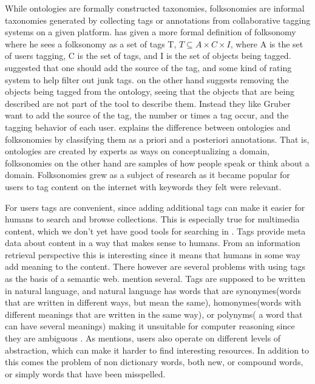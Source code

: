 While ontologies are formally constructed taxonomies, folksonomies are informal taxonomies generated by collecting tags or annotations from collaborative tagging systems on a given platform\citep{Tang2009}.
\citet{Mika2005} has given a more formal definition of folksonomy where he sees a folksonomy as a set of tags T,
$T \subseteq A \times C \times I$, where A is the set of users tagging, C is the set of tags, and I is the set of objects being tagged.
\citet{Gruber2007} suggested that one should add the source of the tag, and some kind of rating system to help filter out junk tags.
\citet{Scerri2008} on the other hand suggests removing the objects being tagged from the ontology,
seeing that the objects that are being described are not part of the tool to describe them.
Instead they like Gruber want to add the source of the tag, the number or times a tag occur, and the tagging behavior of each user.
\citet{Bang2008} explains the difference between ontologies and folksonomies by classifying them as a priori and a posteriori annotations.
That is, ontologies are created by experts as ways on conceptualizing a domain, folksonomies on the other hand are samples of how people speak or think about a domain.
Folksonomies grew as a subject of research as it became popular for users to tag content on the internet with keywords they felt were relevant.

For users tags are convenient, since adding additional tags can make it easier for humans to search and browse collections.
This is especially true for multimedia content, which we don't yet have good tools for searching in \citep{Weinberger2008}.
Tags provide meta data about content in a way that makes sense to humans.
From an information retrieval perspective this is interesting since it means that humans in some way add meaning to the content.
There however are several problems with using tags as the basis of a semantic web.
\citet{Tang2009} mention several.
Tags are supposed to be written in natural language, and natural language has words that are synonymes(words that are written in different ways,
but mean the same), homonymes(words with different meanings that are written in the same way), or polynyms( a word that can have several meanings)
making it unsuitable for computer reasoning since they are ambiguous \citep{Passant2008}.
As \citet{Golder2005} mentions, users also operate on different levels of abstraction, which can make it harder to find interesting resources.
In addition to this comes the problem of non dictionary words, both new, or compound words, or simply words that have been misspelled\citep{Tonkin2006}.


